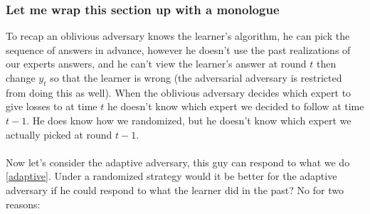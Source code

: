 \documentclass[11pt]{article}
\theoremstyle{quest}
\begin{document}
\subsubsection{Let me wrap this section up with a monologue}
To recap an oblivious adversary knows the learner's algorithm, he can pick the sequence of answers in advance, however he doesn't use the past realizations of our experts answers, and he can't view the learner's answer at round $t$ then change $y_t$ so that the learner is wrong (the adversarial adversary is restricted from doing this as well).  When the oblivious adversary decides which expert to give losses to at time $t$ he doesn't know which expert we decided to follow at time $t-1$. He does know how we randomized, but he doesn't know which expert we actually picked at round $t-1$. \\ \\
Now let's consider the adaptive adversary, this guy  can respond to what we do {\color{blue} \autoref{adaptive}}. Under a randomized strategy would it be better for the adaptive adversary if he could respond to what the learner did in the past? 
No for two reasons:
\end{document}
